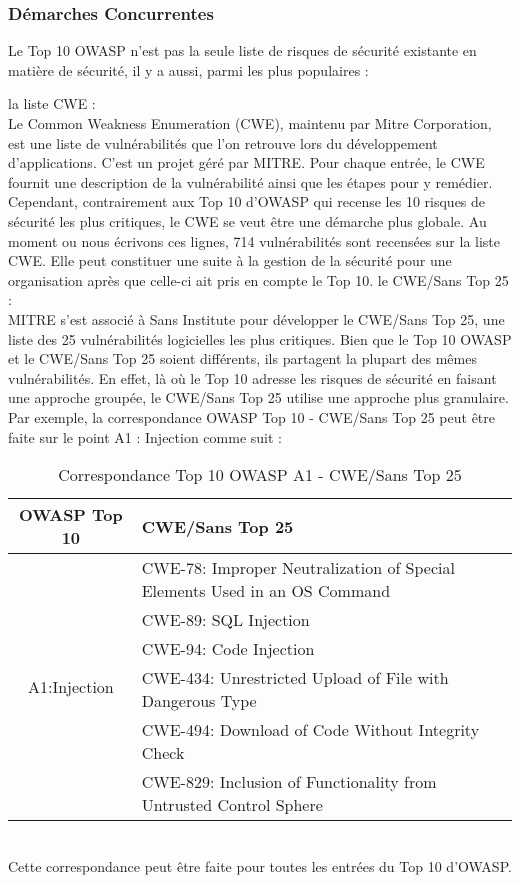 \subsubsection{Démarches Concurrentes}
Le Top 10 OWASP n’est pas la seule liste de risques de sécurité existante en matière de sécurité, il y a aussi, parmi les plus populaires : 
\begin{itemize}
	\itemcheck la liste CWE : \\
	Le Common Weakness Enumeration (CWE), maintenu par Mitre Corporation, est une liste de vulnérabilités que l’on retrouve lors du développement d’applications. C'est un projet  géré par MITRE. Pour chaque entrée, le CWE fournit une description de la vulnérabilité ainsi que les étapes pour y remédier.\\
	Cependant, contrairement aux Top 10 d’OWASP qui recense les 10 risques de sécurité les plus critiques, le CWE se veut être une démarche plus globale. Au moment ou nous écrivons ces lignes, 714 vulnérabilités sont recensées sur la liste CWE. Elle peut constituer une suite à la gestion de la sécurité pour une organisation après que celle-ci ait pris en compte le Top 10.
	\itemcheck le CWE/Sans Top 25 : \\
	MITRE s'est associé à Sans Institute pour développer le CWE/Sans Top 25, une liste des 25 vulnérabilités logicielles les plus critiques. Bien que le Top 10 OWASP et le CWE/Sans Top 25 soient différents, ils partagent la plupart des mêmes vulnérabilités. En effet, là où le Top 10 adresse les risques de sécurité en faisant une approche groupée, le CWE/Sans Top 25 utilise une approche plus granulaire. Par exemple, la correspondance OWASP Top 10 - CWE/Sans Top 25 peut être faite sur le point A1 : Injection comme suit \cite{cross}:
	\begin{table}[hbt!]
		\centering
		\begin{tabular}{| c | l |} 
			\hline
			OWASP Top 10 & CWE/Sans Top 25 \\
			\hline
			\multirow{6}{4em}{A1:Injection} & CWE-78: Improper Neutralization of Special Elements Used in an OS Command \\ 
			& CWE-89: SQL Injection\\ 
			& CWE-94: Code Injection\\ 
			& CWE-434: Unrestricted Upload of File with Dangerous Type\\
			& CWE-494: Download of Code Without Integrity Check\\
			& CWE-829: Inclusion of Functionality from Untrusted Control Sphere\\
			\hline
		\end{tabular}
		\caption{Correspondance Top 10 OWASP A1 - CWE/Sans Top 25}
	\end{table}\\
	Cette correspondance peut être faite pour toutes les entrées du Top 10 d’OWASP.
\end{itemize}

